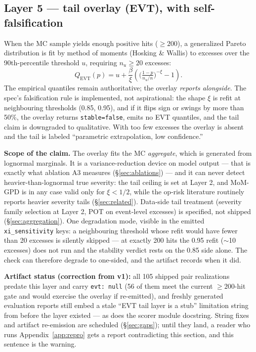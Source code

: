 \documentclass[11pt]{article}
\begin{document}
\subsection{Layer 5 --- tail overlay (EVT), with self-falsification}
\label{sec:evt}

When the MC sample yields enough positive hits ($\ge 200$), a generalized
Pareto distribution is fit by method of moments (Hosking \& Wallis) to
excesses over the 90th-percentile threshold $u$, requiring $n_u \ge 20$
excesses:
\[
Q_{\mathrm{EVT}}(p) = u + \frac{\beta}{\xi}
\left( \Big(\tfrac{1-p}{n_u/n}\Big)^{-\xi} - 1 \right).
\]
The empirical quantiles remain authoritative; the overlay \emph{reports
alongside}. The spec's falsification rule is implemented, not aspirational:
the shape $\xi$ is refit at neighbouring thresholds (0.85, 0.95), and if it
flips sign or swings by more than 50\%, the overlay returns
\texttt{stable=false}, emits no EVT quantiles, and the tail claim is
downgraded to qualitative. With too few excesses the overlay is absent and
the tail is labeled ``parametric extrapolation, low confidence.''

\textbf{Scope of the claim.} The overlay fits the MC \emph{aggregate}, which
is generated from lognormal marginals. It is a variance-reduction device on
model output --- that is exactly what ablation A3 measures
(\S\ref{sec:ablations}) --- and it can never detect heavier-than-lognormal
true severity: the tail ceiling is set at Layer 2, and MoM-GPD is in any
case valid only for $\xi < 1/2$, while the op-risk literature routinely
reports heavier severity tails (\S\ref{sec:related}). Data-side tail
treatment (severity family selection at Layer 2, POT on event-level
excesses) is specified, not shipped (\S\ref{sec:aggregation}). One
degradation mode, visible in the emitted \texttt{xi\_sensitivity} keys: a
neighbouring threshold whose refit would have fewer than 20 excesses is
silently skipped --- at exactly 200 hits the 0.95 refit ($\sim$10 excesses)
does not run and the stability verdict rests on the 0.85 side alone. The
check can therefore degrade to one-sided, and the artifact records when it
did.

\textbf{Artifact status (correction from v1):} all 105 shipped pair
realizations predate this layer and carry \texttt{evt: null} (56 of them
meet the current $\ge 200$-hit gate and would exercise the overlay if
re-emitted), and freshly generated evaluation reports still embed a stale
``EVT tail layer is a stub'' limitation string from before the layer existed
--- as does the scorer module docstring. String fixes and artifact
re-emission are scheduled (\S\ref{sec:gaps}); until they land, a reader who
runs Appendix~\ref{app:repro} gets a report contradicting this section, and
this sentence is the warning.
\end{document}
